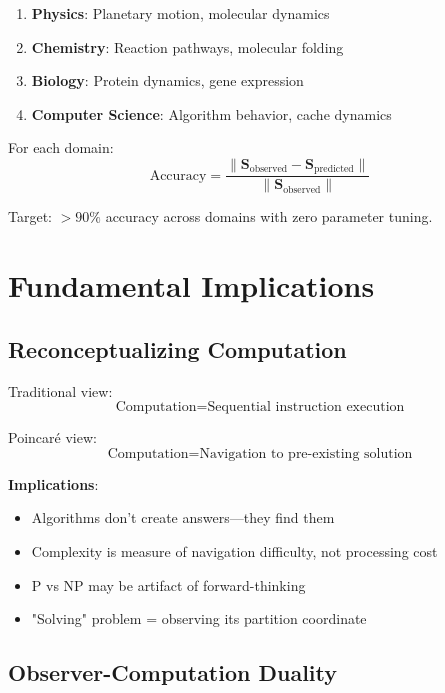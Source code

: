 \documentclass[twocolumn,10pt]{article}
\begin{document}
\begin{enumerate}
\item \textbf{Physics}: Planetary motion, molecular dynamics
\item \textbf{Chemistry}: Reaction pathways, molecular folding
\item \textbf{Biology}: Protein dynamics, gene expression
\item \textbf{Computer Science}: Algorithm behavior, cache dynamics
\end{enumerate}

For each domain:
\begin{equation}
\text{Accuracy} = \frac{\|\mathbf{S}_{\text{observed}} - \mathbf{S}_{\text{predicted}}\|}{\|\mathbf{S}_{\text{observed}}\|}
\end{equation}

Target: $> 90\%$ accuracy across domains with zero parameter tuning.

\section{Fundamental Implications}

\subsection{Reconceptualizing Computation}

Traditional view:
\begin{equation}
\text{Computation} = \text{Sequential instruction execution}
\end{equation}

Poincaré view:
\begin{equation}
\text{Computation} = \text{Navigation to pre-existing solution}
\end{equation}

\textbf{Implications}:
\begin{itemize}
\item Algorithms don't create answers—they find them
\item Complexity is measure of navigation difficulty, not processing cost
\item P vs NP may be artifact of forward-thinking
\item "Solving" problem = observing its partition coordinate
\end{itemize}

\subsection{Observer-Computation Duality}
\end{document}
